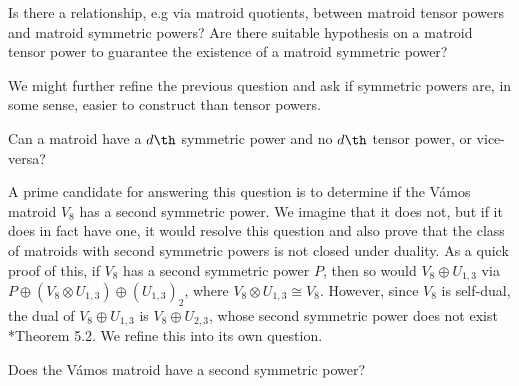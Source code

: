 \begin{question}
Is there a relationship, e.g via matroid quotients, between matroid tensor powers and matroid symmetric powers? Are there suitable hypothesis on a matroid tensor power to guarantee the existence of a matroid symmetric power?
\end{question}

 We might further refine the previous question and ask if symmetric powers are, in some sense,  easier to construct than tensor powers.
\begin{question}\label{question:symprodsWithoutTensor}
Can a matroid have a $d \th$ symmetric power and no $d\th$ tensor power, or vice-versa?
\end{question}

A prime candidate for answering this question is to determine if the V\'amos matroid $V_8$ has a second symmetric power. We imagine that it does not, but if it does in fact have one, it would resolve this question and also prove that the class of matroids with second symmetric powers is not closed under duality. As a quick proof of this, if $V_8$ has a second symmetric power $P$, then so would $V_8\oplus U_{1,3}$ via $P\oplus (V_8\otimes U_{1,3})\oplus (U_{1,3})_2$, where $V_8\otimes U_{1,3}\cong V_8$. However, since $V_8$ is self-dual, the dual of $V_8\oplus U_{1,3}$ is $V_8\oplus U_{2,3}$, whose second symmetric power does not exist \cite{DR19}*{Theorem 5.2}. We refine this into its own question.

\begin{question}\label{question:vamosSym2}
Does the V\'amos matroid have a second symmetric power?
\end{question}






